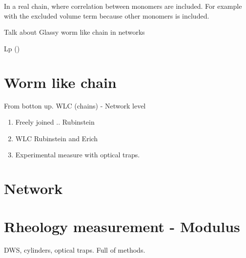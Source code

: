 In a real chain, where correlation between monomers are included.
For example with the excluded volume term because other monomers is included.


Talk about Glassy worm like chain in networks


\gls{Lp}  
 (\citet{storm_nonlinear_2005})
\citet{stein_algorithm_2008}



\section{Worm like chain}
From botton up. WLC (chains) - Network level
\begin{enumerate}
  \item Freely joined .. Rubinstein
  \item WLC Rubinstein and Erich
  \item Experimental measure with optical traps.
\end{enumerate}

\section{Network}

\section{Rheology measurement - Modulus}
DWS, cylinders, optical traps. Full of methods.




